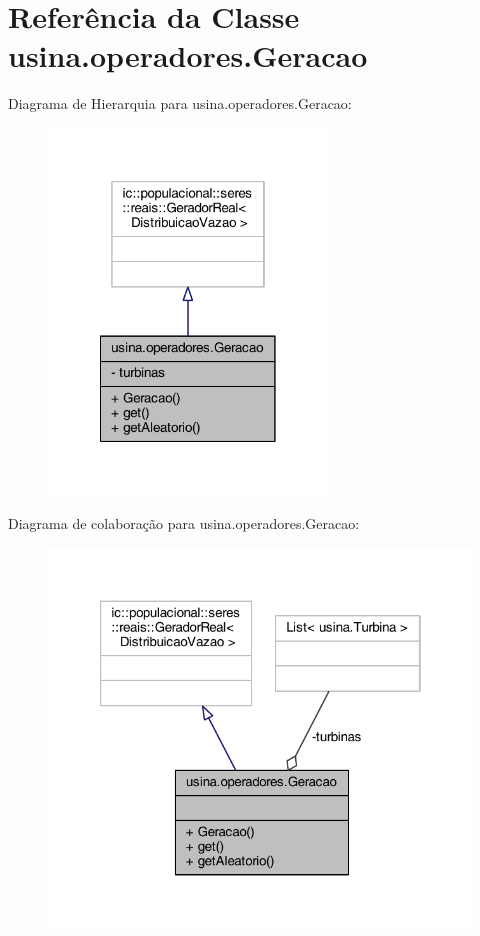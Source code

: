 \hypertarget{classusina_1_1operadores_1_1_geracao}{\section{Referência da Classe usina.\-operadores.\-Geracao}
\label{classusina_1_1operadores_1_1_geracao}
}


Diagrama de Hierarquia para usina.\-operadores.\-Geracao\-:
\nopagebreak
\begin{figure}[H]
\begin{center}
\leavevmode
\includegraphics[width=210pt]{classusina_1_1operadores_1_1_geracao__inherit__graph}
\end{center}
\end{figure}


Diagrama de colaboração para usina.\-operadores.\-Geracao\-:
\nopagebreak
\begin{figure}[H]
\begin{center}
\leavevmode
\includegraphics[width=321pt]{classusina_1_1operadores_1_1_geracao__coll__graph}
\end{center}
\end{figure}
